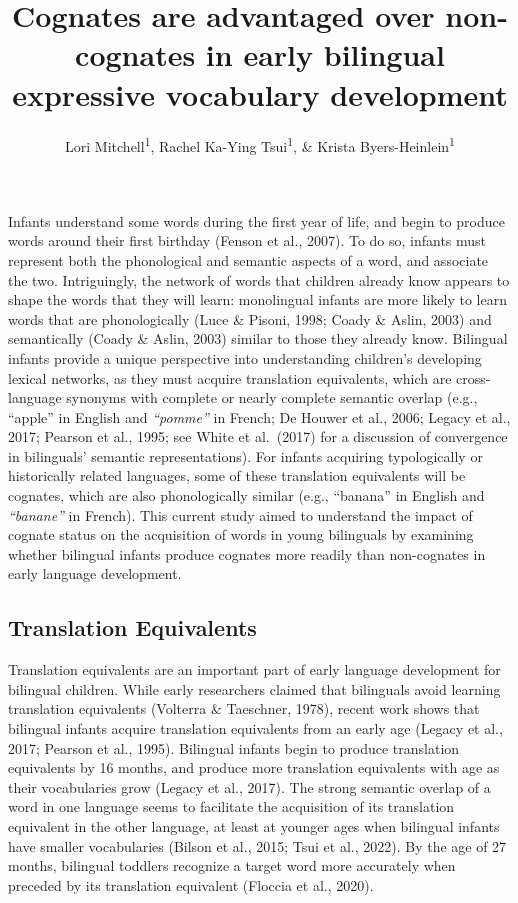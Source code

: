 \documentclass[
  ,man,floatsintext]{apa6}
\title{Cognates are advantaged over non-cognates in early bilingual expressive vocabulary development}
\author{Lori Mitchell\textsuperscript{1}, Rachel Ka-Ying Tsui\textsuperscript{1}, \& Krista Byers-Heinlein\textsuperscript{1}}
\date{}
\affiliation{\vspace{0.5cm}\textsuperscript{1} Concordia University}
\begin{document}
\maketitle

\captionsetup[table]{labelformat=empty}

Infants understand some words during the first year of life, and begin to produce words around their first birthday (Fenson et al., 2007). To do so, infants must represent both the phonological and semantic aspects of a word, and associate the two. Intriguingly, the network of words that children already know appears to shape the words that they will learn: monolingual infants are more likely to learn words that are phonologically (Luce \& Pisoni, 1998; Coady \& Aslin, 2003) and semantically (Coady \& Aslin, 2003) similar to those they already know. Bilingual infants provide a unique perspective into understanding children's developing lexical networks, as they must acquire translation equivalents, which are cross-language synonyms with complete or nearly complete semantic overlap (e.g., ``apple'' in English and \emph{``pomme''} in French; De Houwer et al., 2006; Legacy et al., 2017; Pearson et al., 1995; see White et al.~(2017) for a discussion of convergence in bilinguals' semantic representations). For infants acquiring typologically or historically related languages, some of these translation equivalents will be cognates, which are also phonologically similar (e.g., ``banana''  in English and \emph{``banane''}  in French). This current study aimed to understand the impact of cognate status on the acquisition of words in young bilinguals by examining whether bilingual infants produce cognates more readily than non-cognates in early language development.

\hypertarget{translation-equivalents}{%
\subsection{Translation Equivalents}\label{translation-equivalents}}

Translation equivalents are an important part of early language development for bilingual children. While early researchers claimed that bilinguals avoid learning translation equivalents (Volterra \& Taeschner, 1978), recent work shows that bilingual infants acquire translation equivalents from an early age (Legacy et al., 2017; Pearson et al., 1995). Bilingual infants begin to produce translation equivalents by 16 months, and produce more translation equivalents with age as their vocabularies grow (Legacy et al., 2017). The strong semantic overlap of a word in one language seems to facilitate the acquisition of its translation equivalent in the other language, at least at younger ages when bilingual infants have smaller vocabularies (Bilson et al., 2015; Tsui et al., 2022). By the age of 27 months, bilingual toddlers recognize a target word more accurately when preceded by its translation equivalent (Floccia et al., 2020).
\end{document}
